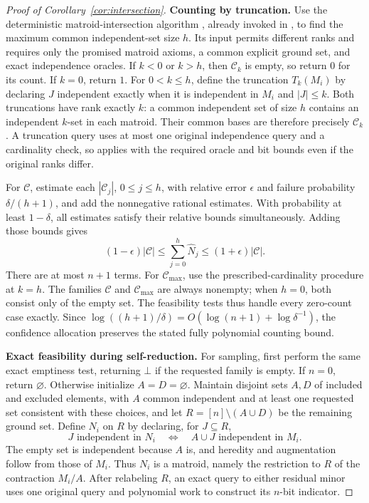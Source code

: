 \documentclass[11pt]{article}
\theoremstyle{definition}
\begin{document}
\begin{proof}[Proof of Corollary~\ref{cor:intersection}]
\textbf{Counting by truncation.}
Use the deterministic matroid-intersection algorithm
\cite[Section~41.2, Theorem~41.4]{Schrijver2003}, already invoked in
, to find the maximum common independent-set size
$h$.  Its input permits different ranks and requires only the promised
matroid axioms, a common explicit ground set, and exact independence
oracles.  If $k<0$ or $k>h$, then $\mathcal C_k$ is empty, so return
$0$ for its count.  If $k=0$, return $1$.  For $0<k\le h$, define the
truncation $T_k(M_i)$ by declaring $J$ independent exactly when it is
independent in $M_i$ and $|J|\le k$.  Both truncations have rank exactly
$k$: a common independent set of size $h$ contains an independent
$k$-set in each matroid.  Their common bases are therefore precisely
$\mathcal C_k$.  A truncation query uses at most one original
independence query and a cardinality check, so  applies
with the required oracle and bit bounds even if the original ranks
differ.

For $\mathcal C$, estimate each $|\mathcal C_j|$, $0\le j\le h$, with
relative error $\epsilon$ and failure probability $\delta/(h+1)$, and
add the nonnegative rational estimates.  With probability at least
$1-\delta$, all estimates satisfy their relative bounds
simultaneously.  Adding those bounds gives
\[
 (1-\epsilon)|\mathcal C|
 \le\sum_{j=0}^h\widehat N_j
 \le(1+\epsilon)|\mathcal C|.
\]
There are at most $n+1$ terms.  For $\mathcal C_{\max}$, use the
prescribed-cardinality procedure at $k=h$.  The families $\mathcal C$
and $\mathcal C_{\max}$ are always nonempty; when $h=0$, both consist
only of the empty set.  The feasibility tests thus handle every
zero-count case exactly.  Since
$\log((h+1)/\delta)=O(\log(n+1)+\log\delta^{-1})$, the confidence
allocation preserves the stated fully polynomial counting bound.

\textbf{Exact feasibility during self-reduction.}
For sampling, first perform the same exact emptiness test, returning
$\bot$ if the requested family is empty.  If $n=0$, return
$\varnothing$.  Otherwise initialize $A=D=\varnothing$.  Maintain
disjoint sets $A,D$ of included and excluded elements, with $A$ common
independent and at least one requested set consistent with these choices, and let
$R=[n]\setminus(A\cup D)$ be the remaining ground set.  Define $N_i$
on $R$ by declaring, for $J\subseteq R$,
\begin{equation}\label{eq:intersectionminor}
 J\text{ independent in }N_i
 \quad\Longleftrightarrow\quad
 A\cup J\text{ independent in }M_i.
\end{equation}
The empty set is independent because $A$ is, and heredity and
augmentation follow from those of $M_i$.  Thus $N_i$ is a matroid,
namely the restriction to $R$ of the contraction $M_i/A$.
After relabeling $R$, an exact query to either residual minor uses
one original query and polynomial work to construct its $n$-bit
indicator.


\end{proof}
\end{document}
